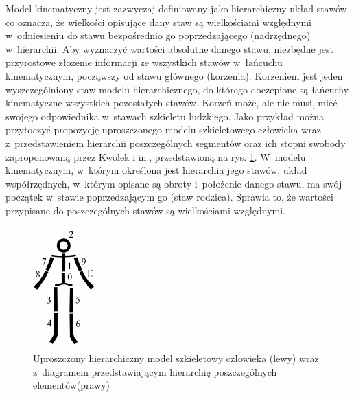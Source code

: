 Model kinematyczny jest zazwyczaj definiowany jako hierarchiczny układ stawów co oznacza, że wielkości opisujące dany staw są wielkościami względnymi w~odniesieniu do stawu bezpośrednio go poprzedzającego (nadrzędnego) w~hierarchii. Aby wyznaczyć wartości absolutne danego stawu, niezbędne jest przyrostowe złożenie informacji ze wszystkich stawów w~łańcuchu kinematycznym, począwszy od stawu głównego (korzenia). Korzeniem jest jeden wyszczególniony staw modelu hierarchicznego, do którego doczepione są łańcuchy kinematyczne wszystkich pozostałych stawów. Korzeń może, ale nie musi, mieć swojego odpowiednika w~stawach szkieletu ludzkiego. Jako przykład można przytoczyć propozycję uproszczonego modelu szkieletowego człowieka wraz z~przedstawieniem hierarchii poszczególnych segmentów oraz ich stopni swobody zaproponowaną przez Kwolek i in.\cite{Kwolek2014}, przedstawioną na rys. \ref{fig:literature:skeletonModelHierarchy}. W~modelu kinematycznym, w~którym określona jest hierarchia jego stawów, układ współrzędnych, w~którym opisane są obroty i~położenie danego stawu, ma swój początek w~stawie poprzedzającym go (staw rodzica). Sprawia to, że wartości przypisane do poszczególnych stawów są wielkościami względnymi.
											
\begin{savenotes}
	\begin{figure}[!htb]
		\centering
		\begin{minipage}{.18\textwidth}
			\centering
			\includegraphics{images/hierarchical-structure.png}       
		\end{minipage}%
		\hfill
		\begin{minipage}{0.75\textwidth}
			\centering
			\scalebox{0.73}{
				
			}
		\end{minipage}
		\caption[Uproszczony hierarchiczny model szkieletowy człowieka wraz z~diagramem przedstawiającym hierarchię poszczególnych elementów]{Uproszczony hierarchiczny model szkieletowy człowieka (lewy) wraz z~diagramem przedstawiającym hierarchię poszczególnych elementów(prawy) \cite{Kwolek2014}}
		\label{fig:literature:skeletonModelHierarchy}
	\end{figure}
\end{savenotes}
													
